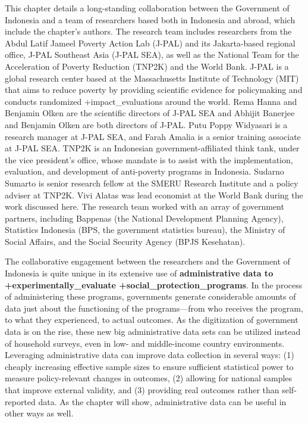 \documentclass[
]{book}
\begin{document}
This chapter details a long-standing collaboration between the Government of Indonesia and a team of researchers based both in Indonesia and abroad, which include the chapter's authors. The research team includes researchers from the Abdul Latif Jameel Poverty Action Lab (J-PAL) and its Jakarta-based regional office, J-PAL Southeast Asia (J-PAL SEA), as well as the National Team for the Acceleration of Poverty Reduction (TNP2K) and the World Bank. J-PAL is a global research center based at the Massachusetts Institute of Technology (MIT) that aims to reduce poverty by providing scientific evidence for policymaking and conducts randomized +impact\_evaluations\textbar{} around the world. Rema Hanna and Benjamin Olken are the scientific directors of J-PAL SEA and Abhijit Banerjee and Benjamin Olken are both directors of J-PAL. Putu Poppy Widyasari is a research manager at J-PAL SEA, and Farah Amalia is a senior training associate at J-PAL SEA. TNP2K is an Indonesian government-affiliated think tank, under the vice president's office, whose mandate is to assist with the implementation, evaluation, and development of anti-poverty programs in Indonesia. Sudarno Sumarto is senior research fellow at the SMERU Research Institute and a policy adviser at TNP2K. Vivi Alatas was lead economist at the World Bank during the work discussed here. The research team worked with an array of government partners, including Bappenas (the National Development Planning Agency), Statistics Indonesia (BPS, the government statistics bureau), the Ministry of Social Affairs, and the Social Security Agency (BPJS Kesehatan).

The collaborative engagement between the researchers and the Government of Indonesia is quite unique in its extensive use of \textbf{administrative data to +experimentally\_evaluate\textbar{} +social\_protection\_programs\textbar{}}. In the process of administering these programs, governments generate considerable amounts of data just about the functioning of the programs---from who receives the program, to what they experienced, to actual outcomes. As the digitization of government data is on the rise, these new big administrative data sets can be utilized instead of household surveys, even in low- and middle-income country environments. Leveraging administrative data can improve data collection in several ways: (1) cheaply increasing effective sample sizes to ensure sufficient statistical power to measure policy-relevant changes in outcomes, (2) allowing for national samples that improve external validity, and (3) providing real outcomes rather than self-reported data. As the chapter will show, administrative data can be useful in other ways as well.
\end{document}
